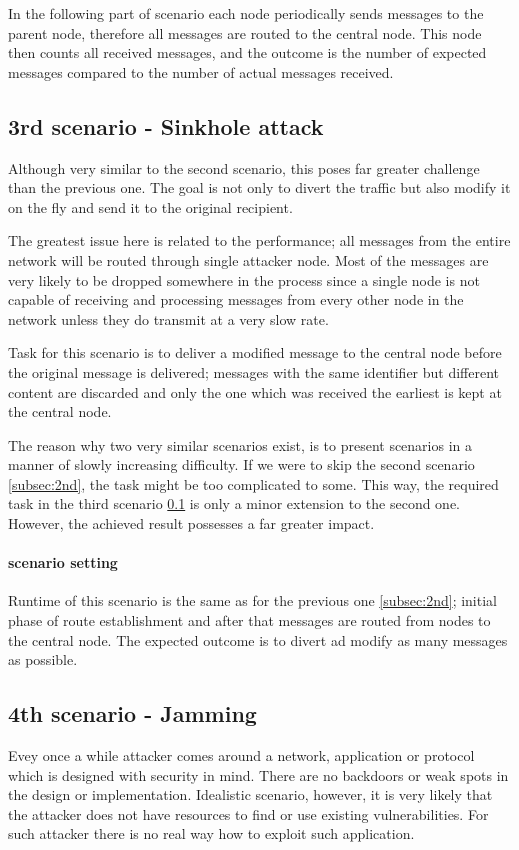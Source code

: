 \documentclass[
  print, %
  Table,   %
  nolof,     %
  nolot,     %
           oneside
]{fithesis3}
\begin{document}
    In the following part of scenario each node periodically sends messages to the parent node, therefore all messages are routed to the central node. This node then counts all received messages, and the outcome is the number of expected messages compared to the number of actual messages received.

    \subsection{3rd scenario - Sinkhole attack}\label{subsec:3rd}
    Although very similar to the second scenario, this poses far greater challenge than the previous one. The goal is not only to divert the traffic but also modify it on the fly and send it to the original recipient.

    The greatest issue here is related to the performance; all messages from the entire network will be routed through single attacker node. Most of the messages are very likely to be dropped somewhere in the process since a single node is not capable of receiving and processing messages from every other node in the network unless they do transmit at a very slow rate.

    Task for this scenario is to deliver a modified message to the central node before the original message is delivered; messages with the same identifier but different content are discarded and only the one which was received the earliest is kept at the central node.

    The reason why two very similar scenarios exist, is to present scenarios in a manner of slowly increasing difficulty. If we were to skip the second scenario \ref{subsec:2nd}, the task might be too complicated to some. This way, the required task in the third scenario \ref{subsec:3rd} is only a minor extension to the second one. However, the achieved result possesses a far greater impact.

    \paragraph{scenario setting}
    Runtime of this scenario is the same as for the previous one \ref{subsec:2nd}; initial phase of route establishment and after that messages are routed from nodes to the central node. The expected outcome is to divert ad modify as many messages as possible.

    \subsection{4th scenario - Jamming} \label{subsec:4th}
    Evey once a while attacker comes around a network, application or protocol which is designed with security in mind. There are no backdoors or weak spots in the design or implementation. Idealistic scenario, however, it is very likely that the attacker does not have resources to find or use existing vulnerabilities. For such attacker there is no real way how to exploit such application.
\end{document}
